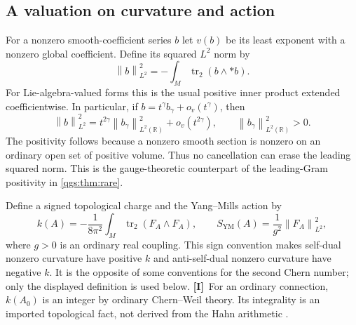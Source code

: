 \documentclass[11pt,oneside]{article}
\numberwithin{equation}{section}
\theoremstyle{plain}
\theoremstyle{definition}
\theoremstyle{remark}
\newcommand{\R}{\mathbb R}
\newcommand{\SYM}{S_{\mathrm{YM}}}
\DeclareMathOperator{\tr}{tr}
\newcommand{\norm}[1]{\left\|#1\right\|}
\newcommand{\TI}{\textcolor{TierI}{\textsf{\bfseries[I]}}}
\begin{document}
\subsection{A valuation on curvature and action}
For a nonzero smooth-coefficient series $b$ let $v(b)$ be its least exponent with a nonzero global coefficient. Define its squared $L^2$ norm by
\begin{equation}\label{qgs:obs:eq:L2}
 \norm b_{L^2}^2=-\int_M\tr_2(b\wedge *b).
\end{equation}
For Lie-algebra-valued forms this is the usual positive inner product extended coefficientwise. In particular, if $b=t^\gamma b_\gamma+o_v(t^\gamma)$, then
\begin{equation}\label{qgs:obs:eq:L2lead}
 \norm b_{L^2}^2
 =t^{2\gamma}\norm{b_\gamma}_{L^2(\R)}^2+o_v(t^{2\gamma}),
 \qquad \norm{b_\gamma}_{L^2(\R)}^2>0.
\end{equation}
The positivity follows because a nonzero smooth section is nonzero on an ordinary open set of positive volume. Thus no cancellation can erase the leading squared norm. This is the gauge-theoretic counterpart of the leading-Gram positivity in \cref{qgs:thm:rare}.

Define a signed topological charge and the Yang--Mills action by
\begin{equation}\label{qgs:obs:eq:chargeaction}
 k(A)=-\frac1{8\pi^2}\int_M\tr_2(F_A\wedge F_A),
 \qquad \SYM(A)=\frac1{g^2}\norm{F_A}_{L^2}^2,
\end{equation}
where $g>0$ is an ordinary real coupling. This sign convention makes self-dual nonzero curvature have positive $k$ and anti-self-dual nonzero curvature have negative $k$. It is the opposite of some conventions for the second Chern number; only the displayed definition is used below. \TI\ For an ordinary connection, $k(A_0)$ is an integer by ordinary Chern--Weil theory. Its integrality is an imported topological fact, not derived from the Hahn arithmetic \cite{AHS,Itoh}.
\end{document}
